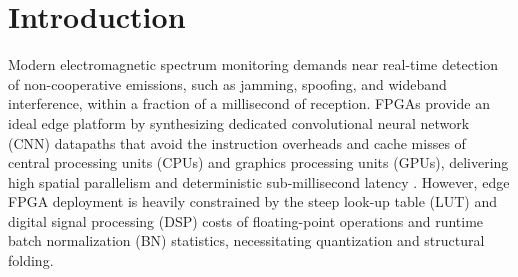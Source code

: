 \documentclass[conference]{IEEEtran}
\begin{document}
\section{Introduction}

Modern electromagnetic spectrum monitoring demands near real-time detection of non-cooperative emissions, such as jamming, spoofing, and wideband interference, within a fraction of a millisecond of reception. FPGAs provide an ideal edge platform by synthesizing dedicated convolutional neural network (CNN) datapaths that avoid the instruction overheads and cache misses of central processing units (CPUs) and graphics processing units (GPUs), delivering high spatial parallelism and deterministic sub-millisecond latency \cite{b1, b2}. However, edge FPGA deployment is heavily constrained by the steep look-up table (LUT) and digital signal processing (DSP) costs of floating-point operations and runtime batch normalization (BN) statistics, necessitating quantization and structural folding.
\end{document}
